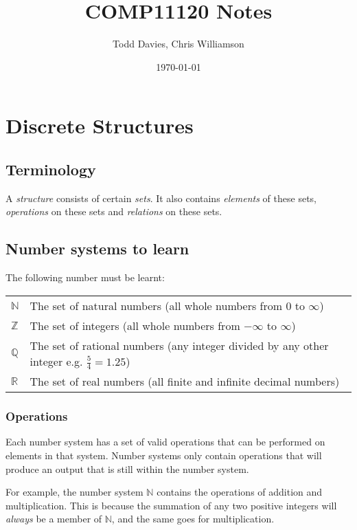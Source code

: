 \documentclass{article}
\author{Todd Davies, Chris Williamson}
\title{COMP11120 Notes}
\date{\today}
\begin{document}
\lhead{\today}

\maketitle
\tableofcontents
\newpage

\section{Discrete Structures}

\subsection{Terminology}

A {\it structure} consists of certain {\it sets}. It also contains {\it elements} of these sets, {\it operations} on these sets and {\it relations} on these sets.

\subsection{Number systems to learn}

The following number must be learnt:

\begin{tabularx}{\textwidth}{l X}
	$\mathbb{N}$ & The set of natural numbers (all whole numbers from $0$ to $\infty$)\\

	$\mathbb{Z}$ & The set of integers (all whole numbers from $-\infty$ to $\infty$)\\

	$\mathbb{Q}$ & The set of rational numbers (any integer divided by any other integer e.g. $\frac{5}{4}=1.25$)\\

	$\mathbb{R}$ & The set of real numbers (all finite and infinite decimal numbers)\\
\end{tabularx}

\subsubsection{Operations}

Each number system has a set of valid operations that can be performed on elements in that system. Number systems only contain operations that will produce an output that is still within the number system.

For example, the number system $\mathbb{N}$ contains the operations of addition and multiplication. This is because the summation of any two positive integers will {\it always} be a member of $\mathbb{N}$, and the same goes for multiplication.
\end{document}
